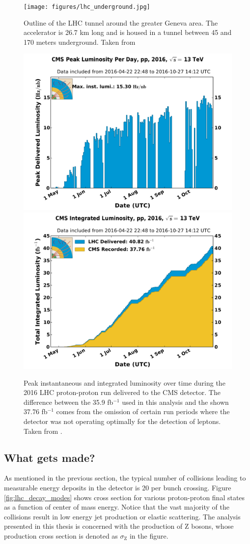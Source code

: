   \begin{figure}[h!]
    \centering
    \texttt{[image: figures/lhc\_underground.jpg]}
    \caption{Outline of the LHC tunnel around the greater Geneva area. The accelerator is 26.7 km long and is housed in a tunnel between 45 and 170 meters underground. Taken from \cite{LHC_underground}}
    \label{fig:lhc_tunnel}
  \end{figure}

  \begin{figure}[h!]
    \centering
    \includegraphics[width=.48\textwidth]{figures/peak_lumi_per_day_pp_2016.pdf}
    \includegraphics[width=.48\textwidth]{figures/int_lumi_per_day_cumulative_pp_2016.pdf}
    \caption[Peak instantaneous and integrated luminosity over time during the 2016 LHC proton-proton run delivered to the CMS detector.]{Peak instantaneous and integrated luminosity over time during the 2016 LHC proton-proton run delivered to the CMS detector. The difference between the 35.9 fb$^{-1}$ used in this analysis and the shown 37.76 fb$^{-1}$ comes from the omission of certain run periods where the detector was not operating optimally for the detection of leptons. Taken from \cite{lumi_twiki}.}
    \label{fig:lumi_stats}
  \end{figure}

  \subsection{What gets made?} \label{sec:what_gets_made}
    As mentioned in the previous section, the typical number of collisions leading to measurable energy deposits in the detector is 20 per bunch crossing. Figure \ref{fig:lhc_decay_modes} shows cross section for various proton-proton final states as a function of center of mass energy. Notice that the vast majority of the collisions result in low energy jet production or elastic scattering. The analysis presented in this thesis is concerned with the production of Z bosons, whose production cross section is denoted as $\sigma_\text{Z}$ in the figure.

